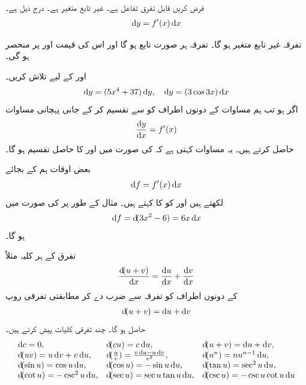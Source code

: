 \\
فرض کریں  قابل تفرق تفاعل ہے۔    غیر تابع متغیر ہے۔   درج ذیل ہے۔
\begin{align*}
\dif y=f'(x)\dif x
\end{align*}

تفرقہ   غیر تابع متغیر  ہو گا۔ تفرقہ   ہر صورت تابع ہو گا اور اس کی قیمت  اور  پر منحصر ہو گی۔

 اور  کے لیے  تلاش کریں۔\\
\begin{align*}
\dif y=(5x^4+37)\dif y,\quad \dif y=(3\cos 3x)\dif x
\end{align*}
اگر  ہو تب ہم مساوات  کے دونوں اطراف کو  سے تقسیم کر کے جانی پہچانی مساوات
\begin{align*}
\frac{\dif y}{\dif x}=f'(x)
\end{align*}
حاصل کرتے ہیں۔ یہ مساوات کہتی ہے کہ  کی صورت میں    اور   کا حاصل تقسیم ہو گا۔

بعض اوقات ہم  کے  بجائے 
\begin{align*}
\dif f=f'(x)\dif x
\end{align*}
لکھتے ہیں اور  کو  کا  کہتے ہیں۔ مثال کے طور پر  کی صورت میں
\begin{align*}
\dif f=\dif (3x^2-6)=6x\dif x
\end{align*}
ہو گا۔


تفرق کے ہر کلیہ مثلاً
\begin{align*}
\frac{\dif(u+v)}{\dif x}=\frac{\dif u}{\dif x}+\frac{\dif v}{\dif x}
\end{align*}
 کے دونوں اطراف کو  تفرقہ  سے ضرب دے کر مطابقتی تفرقی روپ
\begin{align*}
\dif (u+v)=\dif u+\dif v
\end{align*}
حاصل ہو گا۔ چند تفرقی کلیات پیش کرتے ہیں۔
\begin{align*}
\begin{array}{lll}
\dif c=0,&\dif (cu)=c\dif u,&\dif (u+v)=\dif u+\dif v,\\
\dif(uv)=u\dif v+v\dif u,&\dif(\tfrac{u}{v})=\frac{v\dif u-u\dif v}{v^2},&\dif (u^n)=nu^{n-1}\dif u,\\
\dif(\sin u)=\cos u\dif u,&\dif (\cos u)=-\sin u \dif u,&\dif (\tan u)=\sec^2u\dif u,\\
\dif (\cot u)=-\csc^2u\dif u,&\dif(\sec u)=\sec u\tan u\dif u,&\dif(\csc u)=-\csc u\cot u\dif u
\end{array}
\end{align*}

